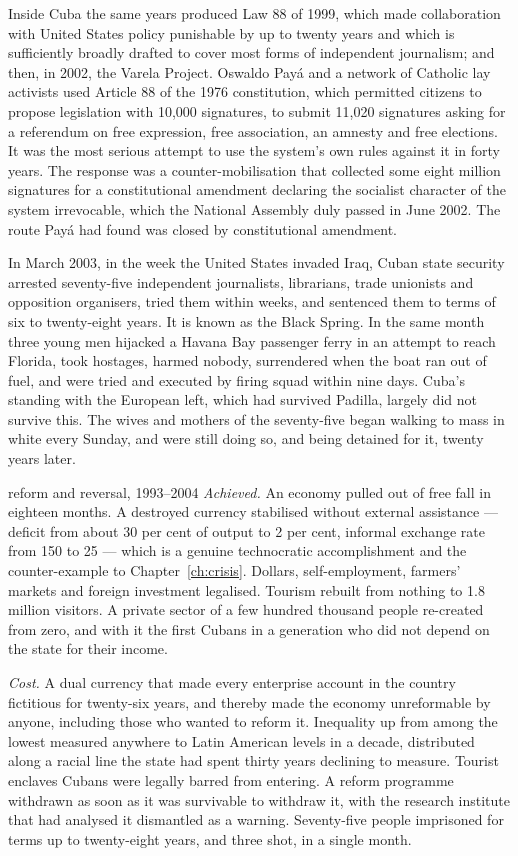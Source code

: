 Inside Cuba the same years produced Law 88 of 1999, which made collaboration
with United States policy punishable by up to twenty years and which is
sufficiently broadly drafted to cover most forms of independent journalism; and
then, in 2002, the Varela Project. Oswaldo Pay\'a and a network of Catholic lay
activists used Article 88 of the 1976 constitution, which permitted citizens to
propose legislation with 10,000 signatures, to submit 11,020 signatures asking
for a referendum on free expression, free association, an amnesty and free
elections. It was the most serious attempt to use the system's own rules against
it in forty years. The response was a counter-mobilisation that collected some
eight million signatures for a constitutional amendment declaring the socialist
character of the system irrevocable, which the National Assembly duly passed in
June 2002. The route Pay\'a had found was closed by constitutional amendment.

In March 2003, in the week the United States invaded Iraq, Cuban state security
arrested seventy-five independent journalists, librarians, trade unionists and
opposition organisers, tried them within weeks, and sentenced them to terms of
six to twenty-eight years. It is known as the Black Spring. In the same month
three young men hijacked a Havana Bay passenger ferry in an attempt to reach
Florida, took hostages, harmed nobody, surrendered when the boat ran out of
fuel, and were tried and executed by firing squad within nine days. Cuba's
standing with the European left, which had survived Padilla, largely did not
survive this. The wives and mothers of the seventy-five began walking to mass in
white every Sunday, and were still doing so, and being detained for it, twenty
years later.

\begin{ledger}{reform and reversal, 1993--2004}
\emph{Achieved.} An economy pulled out of free fall in eighteen months. A
destroyed currency stabilised without external assistance --- deficit from
about 30 per cent of output to 2 per cent, informal exchange rate from 150 to
25 --- which is a genuine technocratic accomplishment and the counter-example
to Chapter~\ref{ch:crisis}. Dollars, self-employment, farmers' markets and
foreign investment legalised. Tourism rebuilt from nothing to 1.8 million
visitors. A private sector of a few hundred thousand people re-created from
zero, and with it the first Cubans in a generation who did not depend on the
state for their income.

\emph{Cost.} A dual currency that made every enterprise account in the country
fictitious for twenty-six years, and thereby made the economy unreformable by
anyone, including those who wanted to reform it. Inequality up from among the
lowest measured anywhere to Latin American levels in a decade, distributed
along a racial line the state had spent thirty years declining to measure.
Tourist enclaves Cubans were legally barred from entering. A reform programme
withdrawn as soon as it was survivable to withdraw it, with the research
institute that had analysed it dismantled as a warning. Seventy-five people
imprisoned for terms up to twenty-eight years, and three shot, in a single
month.
\end{ledger}
